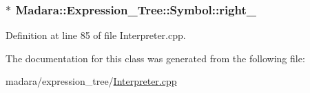 \hypertarget{classMadara_1_1Expression__Tree_1_1Symbol_a13467d1c78fbf06c3d64a6a4770eee7a}{
\subsubsection[{right\_\-}]{$\ast$ {\bf Madara::Expression\_\-Tree::Symbol::right\_\-}}}
\label{d5/d85/classMadara_1_1Expression__Tree_1_1Symbol_a13467d1c78fbf06c3d64a6a4770eee7a}


Definition at line 85 of file Interpreter.cpp.



The documentation for this class was generated from the following file:\begin{DoxyCompactItemize}
\item 
madara/expression\_\-tree/\hyperlink{Interpreter_8cpp}{Interpreter.cpp}\end{DoxyCompactItemize}
